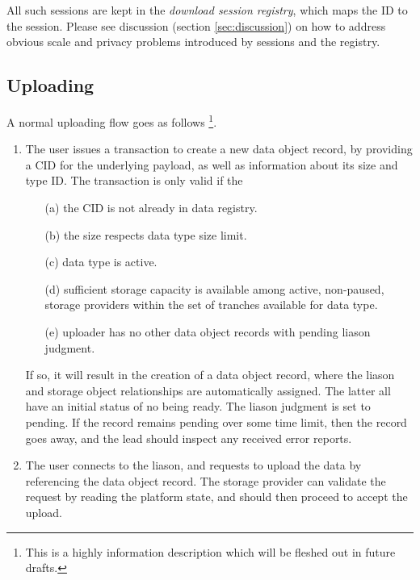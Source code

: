 \documentclass{article}
\begin{document}
All such sessions are kept in the \textit{download session registry}, which maps the ID to the session. Please see discussion (section \ref{sec:discussion}) on how to address obvious scale and privacy problems introduced by sessions and the registry.

\subsection{Uploading} \label{sec:data_storage_and_distribution:uploading}

A normal uploading flow goes as follows \footnote{This is a highly information description which will be fleshed out in future drafts.}.

\begin{enumerate}

\item
The user issues a transaction to create a new data object record, by providing a CID for the underlying payload, as well as information about its size and type ID. The transaction is only valid if the

      \begin{itemize}

          \item[(a)] the CID is not already in data registry.

          \item[(b)] the size respects data type size limit.

          \item[(c)] data type is active.

          \item[(d)] sufficient storage capacity is available among active, non-paused, storage providers within the set of tranches available for data type.

          \item[(e)] uploader has no other data object records with pending liason judgment.

      \end{itemize}

If so, it will result in the creation of a data object record, where the liason and storage object relationships are automatically assigned. The latter all have an initial status of no being ready. The liason judgment is set to pending. If the record remains pending over some time limit, then the record goes away, and the lead should inspect any received error reports.

\item
The user connects to the liason, and requests to upload the data by referencing the data object record. The storage provider can validate the request by reading the platform state, and should then proceed to accept the upload.


\end{enumerate}
\end{document}
